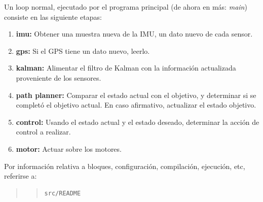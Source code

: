 \documentclass[main]{subfiles}
\begin{document}
Un loop normal, ejecutado por el programa principal (de ahora en más: \textit{main}) consiste en las siguiente etapas:
\begin{enumerate}
\item \textbf{imu:} Obtener una muestra nueva de la IMU, un dato nuevo de cada sensor.
\item \textbf{gps:} Si el GPS tiene un dato nuevo, leerlo.
\item \textbf{kalman:} Alimentar el filtro de Kalman con la información actualizada proveniente de los sensores.
\item \textbf{path planner:} Comparar el estado actual con el objetivo, y determinar si se completó el objetivo actual. En caso afirmativo, actualizar el estado objetivo.
\item \textbf{control:} Usando el estado actual y el estado deseado, determinar la acción de control a realizar.
\item \textbf{motor:} Actuar sobre los motores.
\end{enumerate}

Por información relativa a bloques, configuración, compilación, ejecución, etc, referirse a:
\begin{quote}
\begin{quote}
\begin{verbatim}
src/README
\end{verbatim}
\end{quote}
\end{quote}


\end{document}
